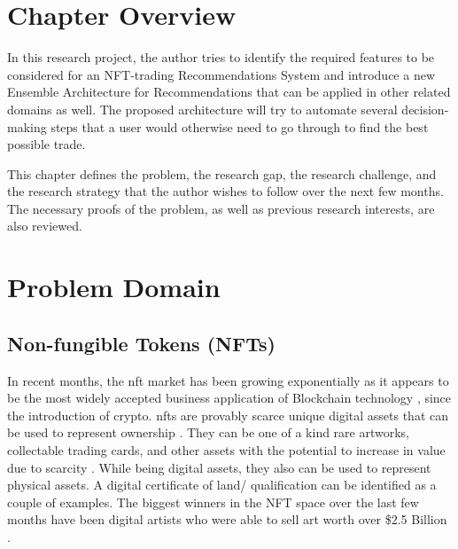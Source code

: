 \section{Chapter Overview}

 In this research project, the author tries to identify the required features to be considered for an NFT-trading Recommendations System and introduce a new Ensemble Architecture for Recommendations that can be applied in other related domains as well. The proposed architecture will try to automate several decision-making steps that a user would otherwise need to go through to find the best possible trade.

This chapter defines the problem, the research gap, the research challenge, and the research strategy that the author wishes to follow over the next few months. The necessary proofs of the problem, as well as previous research interests, are also reviewed.


\section{Problem Domain}
\subsection{Non-fungible Tokens (NFTs)}
In recent months, the \Gls{nft} market has been growing exponentially as it appears to be the most widely accepted business application of Blockchain technology \autocite{dowling_is_2021}, since the introduction of crypto.
\Gls{nft}s are provably scarce unique digital assets that can be used to represent ownership \autocite{noauthor_erc-721_nodate}.
They can be one of a kind rare artworks, collectable trading cards, and other assets with the potential to increase in value due to scarcity \autocite{conti_what_2021, fairfield_tokenized_2021}. While being digital assets, they also can be used to represent physical assets. A digital certificate of land/ qualification can be identified as a couple of examples. The biggest winners in the NFT space over the last few months have been digital artists who were able to sell art worth over \$2.5 Billion \parencite{noauthor_off_2021}.


